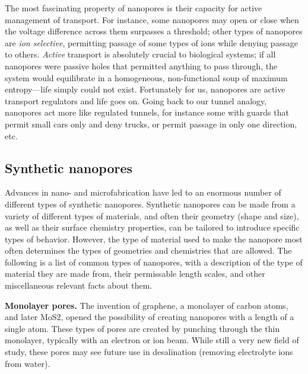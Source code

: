 			The most fascinating property of nanopores is their capacity for active management of transport. For instance, some nanopores may open or close when the voltage difference across them surpasses a threshold; other types of nanopores are \textit{ion selective}, permitting passage of some types of ions while denying passage to others. \textit{Active} transport is absolutely crucial to biological systems; if all nanopores were passive holes that permitted anything to pass through, the system would equilibrate in a homogeneous, non-functional soup of maximum entropy---life simply could not exist. Fortunately for us, nanopores are active transport regulators and life goes on. Going back to our tunnel analogy, nanopores act more like regulated tunnels, for instance some with guards that permit small cars only and deny trucks, or permit passage in only one direction, etc.

		\subsection{Synthetic nanopores}

			Advances in nano- and microfabrication have led to an enormous number of different types of synthetic nanopores. Synthetic nanopores can be made from a variety of different types of materials, and often their geometry (shape and size), as well as their surface chemistry properties, can be tailored to introduce specific types of behavior. However, the type of material used to make the nanopore most often determines the types of geometries and chemistries that are allowed. The following is a list of common types of nanopores, with a description of the type of material they are made from, their permissable length scales, and other miscellaneous relevant facts about them.

			\textbf{Monolayer pores.} The invention of graphene, a monolayer of carbon atoms, and later MoS2, opened the possibility of creating nanopores with a length of a single atom. These types of pores are created by punching through the thin monolayer, typically with an electron or ion beam. While still a very new field of study, these pores may see future use in desalination (removing electrolyte ions from water).


